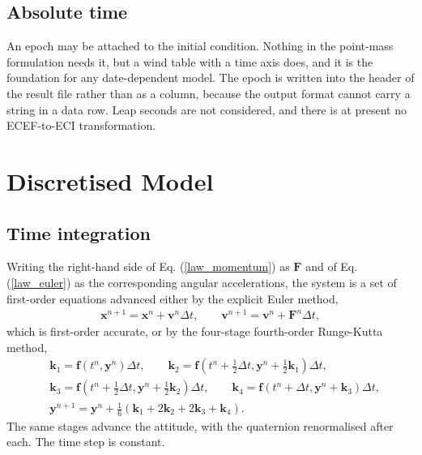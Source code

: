 \documentclass[11pt,a4paper]{article}
\newcommand{\bx}{{\boldsymbol x}}
\newcommand{\bv}{{\boldsymbol v}}
\newcommand{\bF}{{\boldsymbol F}}
\begin{document}
\subsection{Absolute time}

An epoch may be attached to the initial condition. Nothing in the point-mass formulation
needs it, but a wind table with a time axis does, and it is the foundation for any
date-dependent model. The epoch is written into the header of the result file rather than
as a column, because the output format cannot carry a string in a data row. Leap seconds
are not considered, and there is at present no ECEF-to-ECI transformation.

\section{Discretised Model}

\subsection{Time integration}

Writing the right-hand side of Eq. (\ref{law_momentum}) as $\bF$ and of
Eq. (\ref{law_euler}) as the corresponding angular accelerations, the system is a set of
first-order equations advanced either by the explicit Euler method,
%
\begin{align}
	\bx^{n+1} = \bx^{n} + \bv^{n} \Delta t , \qquad
	\bv^{n+1} = \bv^{n} + \bF^{n} \Delta t ,
	\label{euler}
\end{align}
%
which is first-order accurate, or by the four-stage fourth-order Runge-Kutta method,
%
\begin{align}
&	{\boldsymbol k}_1 = {\boldsymbol f} \left( t^n, {\boldsymbol y}^n \right) \Delta t , \qquad
	{\boldsymbol k}_2 = {\boldsymbol f} \left( t^n + \tfrac{1}{2}\Delta t, {\boldsymbol y}^n + \tfrac{1}{2}{\boldsymbol k}_1 \right) \Delta t , \nonumber \\
&	{\boldsymbol k}_3 = {\boldsymbol f} \left( t^n + \tfrac{1}{2}\Delta t, {\boldsymbol y}^n + \tfrac{1}{2}{\boldsymbol k}_2 \right) \Delta t , \qquad
	{\boldsymbol k}_4 = {\boldsymbol f} \left( t^n + \Delta t, {\boldsymbol y}^n + {\boldsymbol k}_3 \right) \Delta t , \\
&	{\boldsymbol y}^{n+1} = {\boldsymbol y}^{n} + \tfrac{1}{6} \left( {\boldsymbol k}_1 + 2 {\boldsymbol k}_2 + 2 {\boldsymbol k}_3 + {\boldsymbol k}_4 \right) . \nonumber
\end{align}
%
The same stages advance the attitude, with the quaternion renormalised after each. The
time step is constant.
\end{document}
